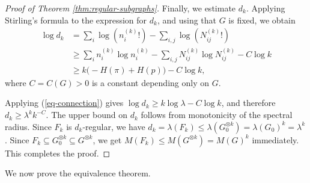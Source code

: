 \documentclass[11pt]{article}
\theoremstyle{definition}
\theoremstyle{plain}
\begin{document}
\begin{proof}[Proof of Theorem \ref{thm:regular-subgraphs}]
Finally, we estimate \(d_k\).   Applying Stirling's
formula to the expression for \(d_k\), and using that \(G\) is fixed, we
obtain
\[
\begin{aligned}
        \log d_k
        &=
        \sum_i \log(n_i^{(k)}!)
        -
        \sum_{i,j}\log(N_{ij}^{(k)}!)                                      \\
        &\ge
        \sum_i n_i^{(k)}\log n_i^{(k)}
        -
        \sum_{i,j}N_{ij}^{(k)}\log N_{ij}^{(k)}
        -
        C\log k                                                            \\
        &\ge
        k\bigl(-H(\pi) + H(p) \bigr)-C\log k,
\end{aligned}
\]
where \(C=C(G)>0\) is a constant depending only on $G$.

Applying (\ref{eq-connection}) gives $\log d_k\ge k\log\lambda-C\log k$,
and therefore  $d_k\ge \lambda^k k^{-C}. $
The upper bound on \(d_k\) follows from monotonicity of the spectral
radius.  Since \(F_k\) is \(d_k\)-regular, we have $d_k=\lambda(F_k)\le \lambda(G_0^{\otimes k})=\lambda(G_0)^k=\lambda^k$.
Since \(F_k\subseteq G_0^{\otimes k}\subseteq G^{\otimes k}\), we get $M(F_k)\le M(G^{\otimes k})=M(G)^k$ immediately.
This completes the proof.
\end{proof}

We now prove the equivalence theorem.
\end{document}

